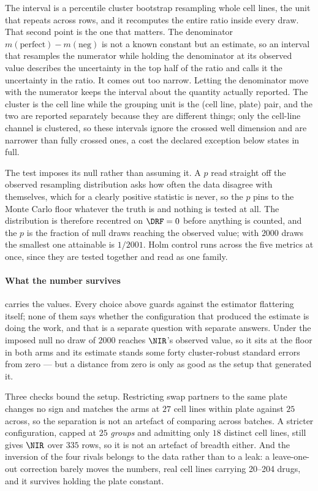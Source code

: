 The interval is a percentile cluster bootstrap resampling whole cell lines, the
unit that repeats across rows, and it recomputes the entire ratio inside every
draw. That second point is the one that matters. The denominator
$m(\textrm{perfect}) - m(\textrm{neg})$ is not a known constant but an estimate,
so an interval that resamples the numerator while holding the denominator at its
observed value describes the uncertainty in the top half of the ratio and calls
it the uncertainty in the ratio. It comes out too narrow. Letting the denominator
move with the numerator keeps the interval about the quantity actually reported.
The cluster is the cell line while the grouping unit is the (cell line, plate)
pair, and the two are reported separately because they are different things; only
the cell-line channel is clustered, so these intervals ignore the crossed well
dimension and are narrower than fully crossed ones, a cost the declared exception
below states in full.

The test imposes its null rather than assuming it. A $p$ read straight off the
observed resampling distribution asks how often the data disagree with
themselves, which for a clearly positive statistic is never, so the $p$ pins to
the Monte Carlo floor whatever the truth is and nothing is tested at all. The
distribution is therefore recentred on $\DRF = 0$ before anything is counted, and
the $p$ is the fraction of null draws reaching the observed value; with
$\num{2000}$ draws the smallest one attainable is $1/2001$. Holm control runs
across the five metrics at once, since they are tested together and read as one
family.
\paragraph{What the number survives}  carries the values. Every
choice above guards against the estimator flattering itself; none of them says
whether the configuration that produced the estimate is doing the work, and that
is a separate question with separate answers. Under the imposed null no draw of
$\num{2000}$ reaches $\NIR$'s observed value, so it sits at the floor in both
arms and its estimate stands some forty cluster-robust standard errors from zero
--- but a distance from zero is only as good as the setup that generated it.

Three checks bound the setup. Restricting swap partners to the same plate changes
no sign and matches the arms at $27$ cell lines within plate against $25$ across,
so the separation is not an artefact of comparing across batches. A stricter
configuration, capped at $25$ \emph{groups} and admitting only $18$ distinct cell
lines, still gives $\NIR$  over $335$ rows, so it is
not an artefact of breadth either. And the inversion of the four rivals belongs
to the data rather than to a leak: a leave-one-out correction barely moves the
numbers, real cell lines carrying 20--204 drugs, and it survives holding the
plate constant.

